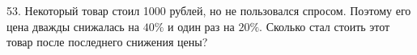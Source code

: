 53. Некоторый товар стоил 1000 рублей, но не пользовался спросом. Поэтому его цена дважды снижалась на $40\%$ и один раз на $20\%.$ Сколько стал стоить этот товар после последнего снижения цены?\\
